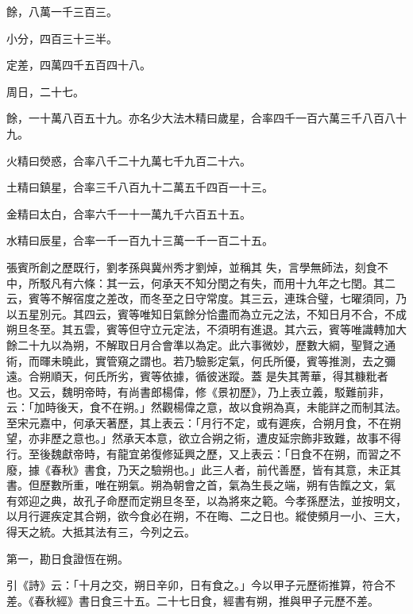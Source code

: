 \begin{pinyinscope}
 餘，八萬一千三百三。



 小分，四百三十三半。



 定差，四萬四千五百四十八。



 周日，二十七。



 餘，一十萬八百五十九。亦名少大法木精曰歲星，合率四千一百六萬三千八百八十九。



 火精曰熒惑，合率八千二十九萬七千九百二十六。



 土精曰鎮星，合率三千八百九十二萬五千四百一十三。



 金精曰太白，合率六千一十一萬九千六百五十五。



 水精曰辰星，合率一千一百九十三萬一千一百二十五。



 張賓所創之歷既行，劉孝孫與冀州秀才劉焯，並稱其
 失，言學無師法，刻食不中，所駁凡有六條：其一云，何承天不知分閏之有失，而用十九年之七閏。其二云，賓等不解宿度之差改，而冬至之日守常度。其三云，連珠合璧，七曜須同，乃以五星別元。其四云，賓等唯知日氣餘分恰盡而為立元之法，不知日月不合，不成朔旦冬至。其五雲，賓等但守立元定法，不須明有進退。其六云，賓等唯識轉加大餘二十九以為朔，不解取日月合會準以為定。此六事微妙，歷數大綱，聖賢之通術，而暉未曉此，實管窺之謂也。若乃驗影定氣，何氏所優，賓等推測，去之彌遠。合朔順天，何氏所劣，賓等依據，循彼迷蹤。蓋
 是失其菁華，得其糠粃者也。又云，魏明帝時，有尚書郎楊偉，修《景初歷》，乃上表立義，駁難前非，云：「加時後天，食不在朔。」然觀楊偉之意，故以食朔為真，未能詳之而制其法。至宋元嘉中，何承天著歷，其上表云：「月行不定，或有遲疾，合朔月食，不在朔望，亦非歷之意也。」然承天本意，欲立合朔之術，遭皮延宗飾非致難，故事不得行。至後魏獻帝時，有龍宜弟復修延興之歷，又上表云：「日食不在朔，而習之不廢，據《春秋》書食，乃天之驗朔也。」此三人者，前代善歷，皆有其意，未正其書。但歷數所重，唯在朔氣。朔為朝會之首，氣為生長之端，朔有告餼之文，氣
 有郊迎之典，故孔子命歷而定朔旦冬至，以為將來之範。今孝孫歷法，並按明文，以月行遲疾定其合朔，欲今食必在朔，不在晦、二之日也。縱使頻月一小、三大，得天之統。大抵其法有三，今列之云。



 第一，勘日食證恆在朔。



 引《詩》云：「十月之交，朔日辛卯，日有食之。」今以甲子元歷術推算，符合不差。《春秋經》書日食三十五。二十七日食，經書有朔，推與甲子元歷不差。




\end{pinyinscope}
